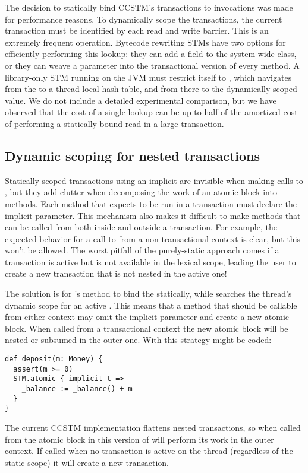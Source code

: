 The decision to statically bind CCSTM's transactions to 
invocations was made for performance reasons.  To dynamically scope
the transactions, the current transaction must be identified by each
read and write barrier.  This is an extremely frequent operation.
Bytecode rewriting STMs have two options for efficiently performing this
lookup: they can add a field to the system-wide  class,
or they can weave a  parameter into the transactional version
of every method.  A library-only STM running on the JVM must restrict
itself to , which navigates from the 
to a thread-local hash table, and from there to the dynamically scoped
value.  We do not include a detailed experimental comparison, but we
have observed that the cost of a single  lookup can
be up to half of the amortized cost of performing a statically-bound
read in a large transaction.

\subsection{Dynamic scoping for nested transactions}

Statically scoped transactions using an implicit  are invisible
when making calls to , but they add clutter when decomposing the
work of an atomic block into methods.  Each method that expects to be run
in a transaction must declare the implicit parameter.  This mechanism also
makes it difficult to make methods that can be called from both inside and
outside a transaction.  For example, the expected behavior for a call to
 from a non-transactional context is clear, but this won't
be allowed.  The worst pitfall of the purely-static approach comes if a
transaction is active but is not available in the lexical scope, leading
the user to create a new transaction that is not nested in the active one!

The solution is for 's method to bind the  statically,
while  searches the thread's dynamic scope for an active
.  This means that a method that should be callable from either
context may omit the implicit  parameter and create a new atomic
block.  When called from a transactional context the new atomic block will
be nested or subsumed in the outer one.  With this strategy 
might be coded:

\lstset{numbers=none}
\lstset{xleftmargin=0.125in}
\begin{lstlisting}
def deposit(m: Money) {
  assert(m >= 0)
  STM.atomic { implicit t =>
    _balance := _balance() + m
  }
}
\end{lstlisting}
\lstset{numbers=left}
\lstset{xleftmargin=0.25in}

The current CCSTM implementation flattens nested transactions, so
when called from the atomic block in  this version of
 will perform its work in the outer context.  If called
when no transaction is active on the thread (regardless of the static
scope) it will create a new transaction.
